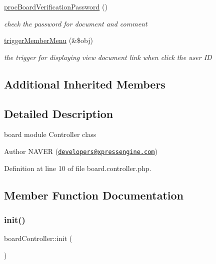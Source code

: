 \begin{DoxyCompactItemize}
\hyperlink{classboardController_a0e52095fdfe92ab0533ac33e329e31c6}{proc\+Board\+Verification\+Password} ()
\begin{DoxyCompactList}\small\item\em check the password for document and comment \end{DoxyCompactList}\item 
\hyperlink{classboardController_a1f462e1fe4adab5463f527be6f0dd2b9}{trigger\+Member\+Menu} (\&\$obj)
\begin{DoxyCompactList}\small\item\em the trigger for displaying \textquotesingle{}view document\textquotesingle{} link when click the user ID \end{DoxyCompactList}\end{DoxyCompactItemize}
\subsection*{Additional Inherited Members}


\subsection{Detailed Description}
board module Controller class 

\begin{DoxyAuthor}{Author}
N\+A\+V\+ER (\href{mailto:developers@xpressengine.com}{\tt developers@xpressengine.\+com}) 
\end{DoxyAuthor}


Definition at line 10 of file board.\+controller.\+php.



\subsection{Member Function Documentation}
\mbox{\label{classboardController_a1e9dcbf2879520adc6c5ce9b68361408}} 
\subsubsection{\texorpdfstring{init()}{init()}}
{\footnotesize\ttfamily board\+Controller\+::init (\begin{DoxyParamCaption}{ }\end{DoxyParamCaption})}



